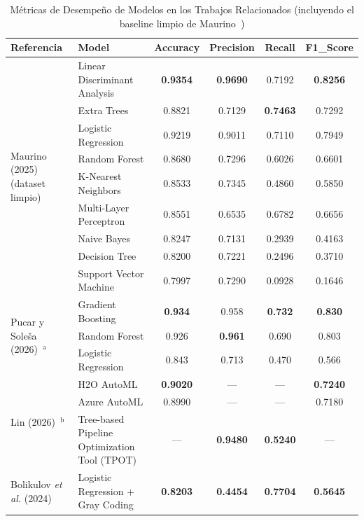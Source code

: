 \documentclass[conference]{IEEEtran}
\begin{document}
\begin{table}[t]
\centering
\footnotesize
\setlength{\tabcolsep}{7pt}
\caption{Métricas de Desempeño de Modelos en los Trabajos Relacionados (incluyendo el baseline limpio de Maurino~\cite{maurino2025dataquality})}
\label{tab:antecedentes_modelos}
\begin{tabular}{@{}llcccc@{}}
\toprule
\textbf{Referencia} & \textbf{Model} & \textbf{Accuracy} & \textbf{Precision} & \textbf{Recall} & \textbf{F1\_Score} \\
\midrule
\multirow{9}{*}{Maurino (2025)~\cite{maurino2025dataquality} (dataset limpio)} & Linear Discriminant Analysis & \textbf{0.9354} & \textbf{0.9690} & 0.7192 & \textbf{0.8256} \\
& Extra Trees & 0.8821 & 0.7129 & \textbf{0.7463} & 0.7292 \\
& Logistic Regression & 0.9219 & 0.9011 & 0.7110 & 0.7949 \\
& Random Forest & 0.8680 & 0.7296 & 0.6026 & 0.6601 \\
& K-Nearest Neighbors & 0.8533 & 0.7345 & 0.4860 & 0.5850 \\
& Multi-Layer Perceptron & 0.8551 & 0.6535 & 0.6782 & 0.6656 \\
& Naive Bayes & 0.8247 & 0.7131 & 0.2939 & 0.4163 \\
& Decision Tree & 0.8200 & 0.7221 & 0.2496 & 0.3710 \\
& Support Vector Machine & 0.7997 & 0.7290 & 0.0928 & 0.1646 \\
\midrule
\multirow{3}{*}{Pucar y Soleša (2026)~\cite{pucar2026consumer}$^{\mathrm{a}}$} & Gradient Boosting & \textbf{0.934} & 0.958 & \textbf{0.732} & \textbf{0.830} \\
& Random Forest & 0.926 & \textbf{0.961} & 0.690 & 0.803 \\
& Logistic Regression & 0.843 & 0.713 & 0.470 & 0.566 \\
\midrule
\multirow{3}{*}{Lin (2026)~\cite{lin2026automl}$^{\mathrm{b}}$} & H2O AutoML & \textbf{0.9020} & --- & --- & \textbf{0.7240} \\
& Azure AutoML & 0.8990 & --- & --- & 0.7180 \\
& Tree-based Pipeline Optimization Tool (TPOT) & --- & \textbf{0.9480} & \textbf{0.5240} & --- \\
\midrule
\multirow{2}{*}{Bolikulov \textit{et al.} (2024)~\cite{bolikulov2024categorical}} & Logistic Regression + Gray Coding & \textbf{0.8203} & \textbf{0.4454} & \textbf{0.7704} & \textbf{0.5645} \\

\end{tabular}
\end{table}
\end{document}
